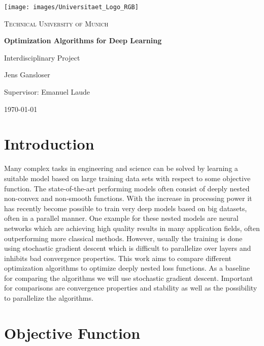 \documentclass[english,11pt,a4paper]{article}
\begin{document}
\begin{titlepage}
	\centering
	
	\texttt{[image: images/Universitaet\_Logo\_RGB]}\par
	\vspace{0.5cm}
	
	{\scshape \large Technical University of Munich \par}
	\vspace{0.5cm}
	
	{\bfseries \Large Optimization Algorithms for Deep Learning \par}
	{Interdisciplinary Project \par}
	\vspace{0.5cm}
	
	{Jens Gansloser \par}
	{Supervisor: Emanuel Laude \par}
	\vspace{0.5cm}
	
	{\today \par}
	\vspace{0.5cm}
\end{titlepage}

\section{Introduction}

Many complex tasks in engineering and science can be solved by learning a suitable model based on large training data sets with respect to some objective function. The state-of-the-art performing models often consist of deeply nested non-convex and non-smooth functions. With the increase in processing power it has recently become possible to train very deep models based on big datasets, often in a parallel manner. One example for these nested models are neural networks which are achieving high quality results in many application fields, often outperforming more classical methods. However, usually the training is done using stochastic gradient descent which is difficult to parallelize over layers and inhibits bad convergence properties. This work aims to compare different optimization algorithms to optimize deeply nested loss functions. As a baseline for comparing the algorithms we will use stochastic gradient descent. Important for comparisons are convergence properties and stability as well as the possibility to parallelize the algorithms.

\section{Objective Function}
\end{document}
